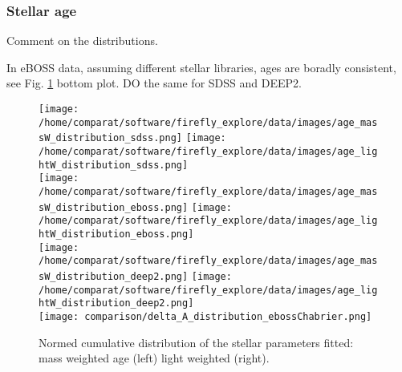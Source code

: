 \documentclass[onecolumn]{aa}
\begin{document}
% 


\subsubsection{Stellar age}

Comment on the distributions.

In eBOSS data, assuming different stellar libraries, ages are boradly consistent, see Fig. \ref{fig:distributions:MwA} bottom plot. DO the same for SDSS and DEEP2.

\begin{figure}
\begin{center}
\caption{\label{fig:distributions:MwA} 
Normed cumulative distribution of the stellar parameters fitted: mass weighted age (left) light weighted (right).}  
\texttt{[image: /home/comparat/software/firefly\_explore/data/images/age\_massW\_distribution\_sdss.png]}
\texttt{[image: /home/comparat/software/firefly\_explore/data/images/age\_lightW\_distribution\_sdss.png]}\\
\texttt{[image: /home/comparat/software/firefly\_explore/data/images/age\_massW\_distribution\_eboss.png]}
\texttt{[image: /home/comparat/software/firefly\_explore/data/images/age\_lightW\_distribution\_eboss.png]}\\
\texttt{[image: /home/comparat/software/firefly\_explore/data/images/age\_massW\_distribution\_deep2.png]}
\texttt{[image: /home/comparat/software/firefly\_explore/data/images/age\_lightW\_distribution\_deep2.png]}\\
\texttt{[image: comparison/delta\_A\_distribution\_ebossChabrier.png]}
\end{center}
\end{figure}
\end{document}
